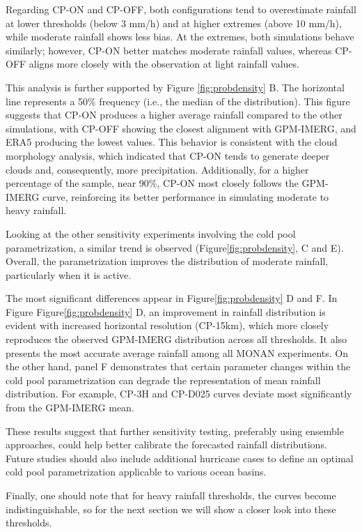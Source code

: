 Regarding CP-ON and CP-OFF, both configurations tend to overestimate rainfall at lower thresholds (below 3 mm/h) and at higher extremes (above 10 mm/h), while moderate rainfall shows less bias. At the extremes, both simulations behave similarly; however, CP-ON better matches moderate rainfall values, whereas CP-OFF aligns more closely with the observation at light rainfall values.

This analysis is further supported by Figure \ref{fig:probdensity} B. The horizontal line represents a 50\% frequency (i.e., the median of the distribution). This figure suggests that CP-ON produces a higher average rainfall compared to the other simulations, with CP-OFF showing the closest alignment with GPM-IMERG, and ERA5 producing the lowest values. This behavior is consistent with the cloud morphology analysis, which indicated that CP-ON tends to generate deeper clouds and, consequently, more precipitation. Additionally, for a higher percentage of the sample, near 90\%, CP-ON most closely follows the GPM-IMERG curve, reinforcing its better performance in simulating moderate to heavy rainfall.

Looking at the other sensitivity experiments involving the cold pool parametrization, a similar trend is observed (Figure\ref{fig:probdensity}, C and E). Overall, the parametrization improves the distribution of moderate rainfall, particularly when it is active.

The most significant differences appear in Figure\ref{fig:probdensity} D and F. In Figure Figure\ref{fig:probdensity} D, an improvement in rainfall distribution is evident with increased horizontal resolution (CP-15km), which more closely reproduces the observed GPM-IMERG distribution across all thresholds. It also presents the most accurate average rainfall among all MONAN experiments. On the other hand, panel F demonstrates that certain parameter changes within the cold pool parametrization can degrade the representation of mean rainfall distribution. For example, CP-3H and CP-D025 curves deviate most significantly from the GPM-IMERG mean.

These results suggest that further sensitivity testing, preferably using ensemble approaches, could help better calibrate the forecasted rainfall distributions. Future studies should also include additional hurricane cases to define an optimal cold pool parametrization applicable to various ocean basins.

Finally, one should note that for heavy rainfall thresholds, the curves become indistinguishable, so for the next section we will show a closer look into these thresholds.

